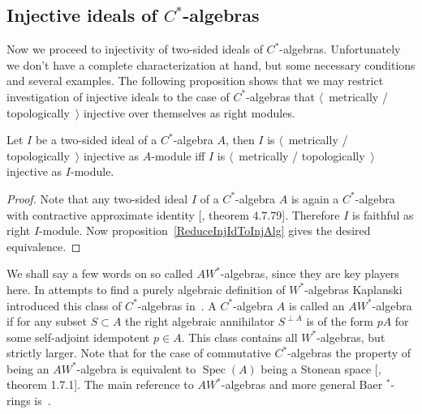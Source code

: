 
\subsection{
    Injective ideals of \texorpdfstring{$C^*$}{C*}-algebras
}\label{SubSectionInjectiveIdealsOfCStarAlgebras}

Now we proceed to injectivity of two-sided ideals of $C^*$-algebras.
Unfortunately we don't have a complete characterization at hand, but some
necessary conditions and several examples. The following proposition shows that
we may restrict investigation of injective ideals to the case of $C^*$-algebras
that $\langle$~metrically / topologically~$\rangle$ injective over themselves as
right modules.

\begin{proposition}\label{MetTopInjOvrAlgIffOvrItslf} Let $I$ be a two-sided
ideal of a $C^*$-algebra $A$, then $I$ is $\langle$~metrically /
topologically~$\rangle$ injective as $A$-module iff $I$ is $\langle$~metrically
/ topologically~$\rangle$ injective as $I$-module.
\end{proposition}
\begin{proof} Note that any two-sided ideal $I$ of a $C^*$-algebra $A$ is again
a $C^*$-algebra with contractive approximate identity [\cite{HelBanLocConvAlg},
theorem 4.7.79]. Therefore $I$ is faithful as right $I$-module. Now
proposition~\ref{ReduceInjIdToInjAlg} gives the desired equivalence.
\end{proof}

We shall say a few words on so called $AW^*$-algebras, since they are key
players here. In attempts to find a purely algebraic definition of
$W^*$-algebras Kaplanski introduced this class of $C^*$-algebras
in~\cite{KaplProjInBanAlg}. A $C^*$-algebra $A$ is called an $AW^*$-algebra if
for any subset $S\subset A$ the right algebraic annihilator
$S^{\perp A}$ is of the form $pA$ for
some self-adjoint idempotent $p\in A$. This class contains all $W^*$-algebras,
but strictly larger. Note that for the case of commutative $C^*$-algebras the
property of being an $AW^*$-algebra is equivalent to  $\operatorname{Spec}(A)$
being a Stonean space [\cite{BerbBaerStarRings}, theorem 1.7.1]. The main
reference to $AW^*$-algebras and more general Baer ${}^*$-rings
is~\cite{BerbBaerStarRings}. 

